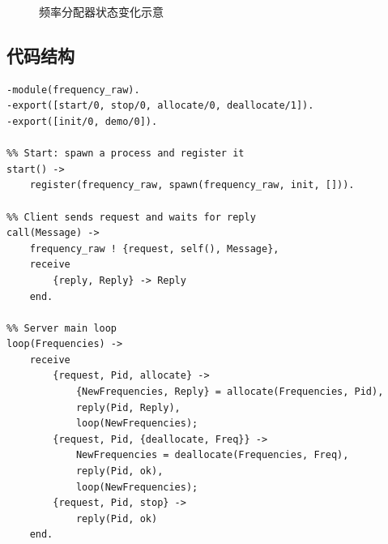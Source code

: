 \documentclass[a4paper,11pt]{article}
\begin{document}
\begin{figure}[H]
\centering
{}
\caption{频率分配器状态变化示意}
\label{fig:freq-pool}
\end{figure}

\subsection{代码结构}

\begin{lstlisting}[style=erlangstyle, caption={frequency\_raw.erl --- 纯 Erlang 进程实现}]
-module(frequency_raw).
-export([start/0, stop/0, allocate/0, deallocate/1]).
-export([init/0, demo/0]).

%% Start: spawn a process and register it
start() ->
    register(frequency_raw, spawn(frequency_raw, init, [])).

%% Client sends request and waits for reply
call(Message) ->
    frequency_raw ! {request, self(), Message},
    receive
        {reply, Reply} -> Reply
    end.

%% Server main loop
loop(Frequencies) ->
    receive
        {request, Pid, allocate} ->
            {NewFrequencies, Reply} = allocate(Frequencies, Pid),
            reply(Pid, Reply),
            loop(NewFrequencies);
        {request, Pid, {deallocate, Freq}} ->
            NewFrequencies = deallocate(Frequencies, Freq),
            reply(Pid, ok),
            loop(NewFrequencies);
        {request, Pid, stop} ->
            reply(Pid, ok)
    end.
\end{lstlisting}
\end{document}
